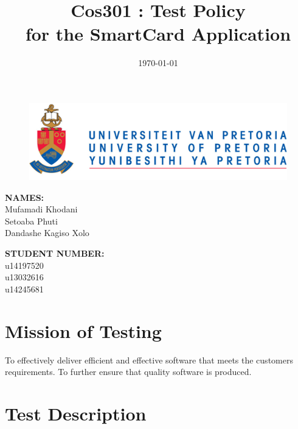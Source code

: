 \documentclass[english]{article}
\title{Cos301 : Test Policy\\
	for the SmartCard Application\\
}
\date{\today}
\begin{document}
	\maketitle
	\begin{figure}[!t]
		\includegraphics{up_logo.png}
	\end{figure}
	\begin{minipage}{0.4\textwidth}
		\begin{flushleft} \large
			\textbf{NAMES:}\\[0.4cm]
			Mufamadi {Khodani} \\
			Setoaba {Phuti} \\
			Dandashe {Kagiso Xolo} \\
			
		\end{flushleft}
	\end{minipage}
	\begin{minipage}{0.4\textwidth}
		\begin{flushright} \large
			\textbf{STUDENT NUMBER:} \\[0.4cm]
			u14197520 \\
			u13032616 \\
			u14245681 \\
		\end{flushright}
	\end{minipage}
	
	
	\newpage
	
	\tableofcontents
	
	
	
	\newpage

	


	

	\section{Mission of Testing}
	To effectively deliver efficient and effective software that meets the customers requirements. To further ensure that quality software is produced.  


	\section{Test Description}
	
\end{document}
